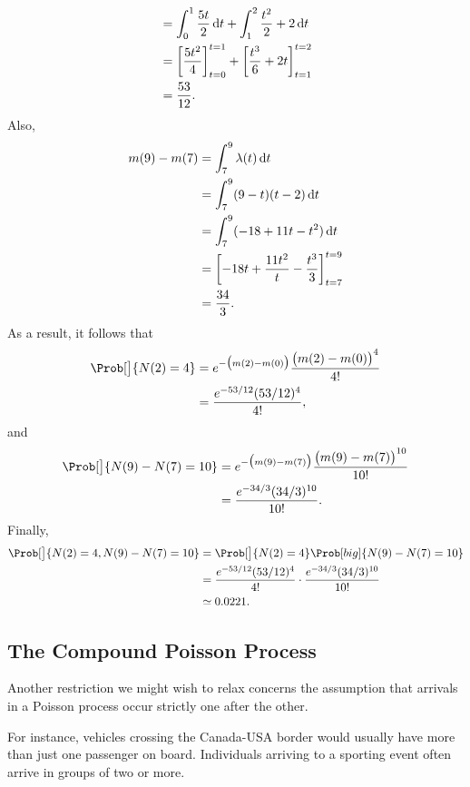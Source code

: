 \begin{Example}
\begin{align*}
         & =\int_{0}^{1}\frac{5t}{2}\odif{t}+\int_{1}^{2}\frac{t^2}{2}+2\odif{t}                \\
         & =\biggl[\frac{5t^2}{4}\biggr]_{t=0}^{t=1}+\biggl[\frac{t^3}{6}+2t\biggr]_{t=1}^{t=2} \\
         & =\frac{53}{12}.
    \end{align*}
    Also,
    \begin{align*}
        m(9)-m(7)
         & =\int_{7}^{9}\lambda(t)\odif{t}                               \\
         & =\int_{7}^{9}(9-t)(t-2)\odif{t}                               \\
         & =\int_{7}^{9}(-18+11t-t^2)\odif{t}                            \\
         & =\biggl[-18t+\frac{11t^2}{t}-\frac{t^3}{3}\biggr]_{t=7}^{t=9} \\
         & =\frac{34}{3}.
    \end{align*}
    As a result, it follows that
    \begin{align*}
        \Prob[\big]{N(2)=4}
         & =e^{-\bigl(m(2)-m(0)\bigr)}\frac{\bigl(m(2)-m(0)\bigr)^4}{4!} \\
         & =\frac{e^{-53/12}(53/12)^4}{4!},
    \end{align*}
    and
    \begin{align*}
        \Prob[\big]{N(9)-N(7)=10}
         & =e^{-\bigl(m(9)-m(7)\bigr)}\frac{\bigl(m(9)-m(7)\bigr)^{10}}{10!} \\
         & =\frac{e^{-34/3}(34/3)^{10}}{10!}.
    \end{align*}
    Finally,
    \begin{align*}
        \Prob[\big]{N(2)=4,N(9)-N(7)=10}
         & =\Prob[\big]{N(2)=4}\Prob[big]{N(9)-N(7)=10}                          \\
         & =\frac{e^{-53/12}(53/12)^4}{4!}\cdot \frac{e^{-34/3}(34/3)^{10}}{10!} \\
         & \simeq 0.0221.
    \end{align*}
\end{Example}
\subsection*{The Compound Poisson Process}
Another restriction we might wish to relax concerns the assumption that arrivals in a Poisson
process occur strictly one after the other.

For instance, vehicles crossing the Canada-USA border would usually have more than just one
passenger on board. Individuals arriving to a sporting event often arrive in groups of two or
more.

